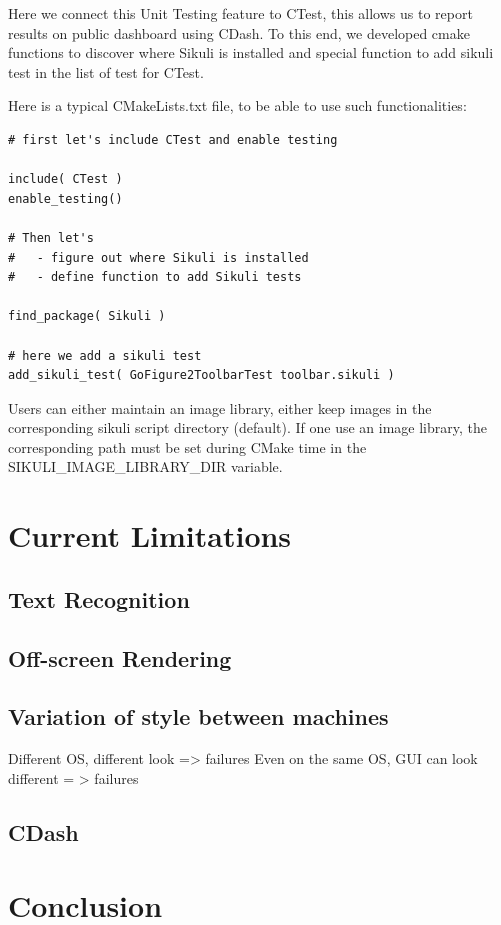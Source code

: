 \documentclass{InsightArticle}
\begin{document}
Here we connect this Unit Testing feature to CTest, this allows us to report
results on public dashboard using CDash. To this end, we developed cmake
functions to discover where Sikuli is installed and special function to add
sikuli test in the list of test for CTest.

Here is a typical CMakeLists.txt file, to be able to use such functionalities:

\begin{verbatim}
# first let's include CTest and enable testing

include( CTest )
enable_testing()

# Then let's
#   - figure out where Sikuli is installed
#   - define function to add Sikuli tests

find_package( Sikuli )

# here we add a sikuli test
add_sikuli_test( GoFigure2ToolbarTest toolbar.sikuli )
\end{verbatim}

Users can either maintain an image library, either keep images in the
corresponding sikuli script directory (default). If one use an image library,
the corresponding path must be set during CMake time in
the SIKULI\_IMAGE\_LIBRARY\_DIR variable.

\section{Current Limitations}
\label{sec:Limitations}

\subsection{Text Recognition}

\subsection{Off-screen Rendering}

\subsection{Variation of style between machines}
Different OS, different look => failures
Even on the same OS, GUI can look different = > failures

\subsection{CDash}

\section{Conclusion}
\label{sec:Conclusion}

\clearpage



\end{document}
